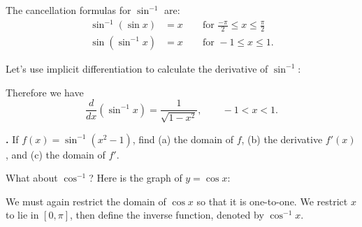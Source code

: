 \documentclass[t]{beamer}
\theoremstyle{plain}
\theoremstyle{definition}
\newcounter{heading}
\newcommand{\newhead}[1]{\medskip\stepcounter{heading}\noindent\textbf{\hspace{0.2cm}{#1}.}}
\begin{document}
\begin{frame}\label{thurs}
\noindent The cancellation formulas for $\sin^{-1}$ are:
\begin{align*}
\sin^{-1}(\sin x) &= x \qquad \text{for } \frac{-\pi}{2} \leq x \leq \frac{\pi}{2}\\
\sin(\sin^{-1}x) &= x \qquad \text{for } -1 \leq x \leq 1.
\end{align*}\pause

\medskip

\noindent Let's use implicit differentiation to calculate the derivative of $\sin^{-1}$:\pause

\noindent Therefore we have
\[ \frac{d}{dx}(\sin^{-1}x) = \frac{1}{\sqrt{1-x^{2}}},\qquad -1 < x < 1.\]\pause

\newhead{Example} If $f(x) = \sin^{-1}(x^{2} - 1)$, find (a) the domain of $f$, (b) the derivative $f'(x)$, and (c) the domain of $f'$.
\end{frame}

\begin{frame}
\noindent What about $\cos^{-1}$? Here is the graph of $y = \cos x$:\pause


\begin{center}
\end{center}\pause

\noindent We must again restrict the domain of $\cos x$ so that it is one-to-one.  We restrict $x$ to lie in $[0,\pi]$, then define the inverse function, denoted by $\cos^{-1}x$.  
\end{frame}
\end{document}
